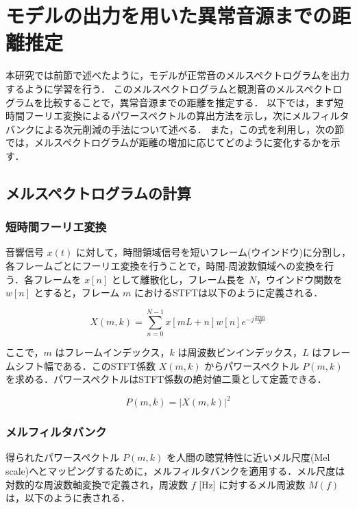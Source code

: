 \documentclass[../main]{subfiles}
\begin{document}
\section{モデルの出力を用いた異常音源までの距離推定}

\label{sec:pmethod_distance_estimation}

本研究では前節で述べたように，モデルが正常音のメルスペクトログラムを出力するように学習を行う．
このメルスペクトログラムと観測音のメルスペクトログラムを比較することで，異常音源までの距離を推定する．
以下では，まず短時間フーリエ変換によるパワースペクトルの算出方法を示し，次にメルフィルタバンクによる次元削減の手法について述べる．
また，この式を利用し，次の節では，メルスペクトログラムが距離の増加に応じてどのように変化するかを示す．

\subsection{メルスペクトログラムの計算}

\subsubsection{短時間フーリエ変換}

音響信号 $x(t)$ に対して，時間領域信号を短いフレーム(ウインドウ)に分割し，各フレームごとにフーリエ変換を行うことで，時間-周波数領域への変換を行う．各フレームを $x[n]$ として離散化し，フレーム長を $N$，ウインドウ関数を $w[n]$ とすると，フレーム $m$ におけるSTFTは以下のように定義される．

\begin{equation}
X(m, k) = \sum_{n=0}^{N-1} x[mL + n] w[n] e^{-j \frac{2\pi k n}{N}}
\end{equation}

ここで，$m$ はフレームインデックス，$k$ は周波数ビンインデックス，$L$ はフレームシフト幅である．このSTFT係数 $X(m, k)$ からパワースペクトル $P(m, k)$ を求める．パワースペクトルはSTFT係数の絶対値二乗として定義できる．

\begin{equation}
P(m, k) = |X(m, k)|^2
\end{equation}

\subsubsection{メルフィルタバンク}

得られたパワースペクトル $P(m, k)$ を人間の聴覚特性に近いメル尺度(Mel scale)へとマッピングするために，メルフィルタバンクを適用する．メル尺度は対数的な周波数軸変換で定義され，周波数 $f$ [Hz] に対するメル周波数 $M(f)$ は，以下のように表される．
\end{document}
